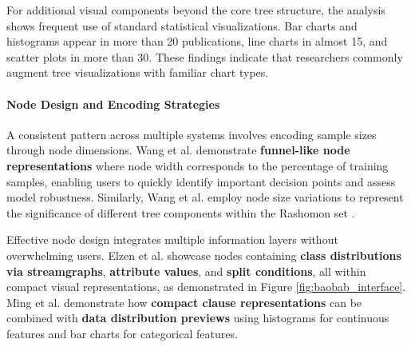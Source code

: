 For additional visual components beyond the core tree structure, the analysis shows frequent use of standard statistical visualizations. Bar charts and histograms appear in more than 20 publications, line charts in almost 15, and scatter plots in more than 30. These findings indicate that researchers commonly augment tree visualizations with familiar chart types.


\paragraph{Node Design and Encoding Strategies}

A consistent pattern across multiple systems involves encoding sample sizes through node dimensions. Wang et al. \cite{wang2022timbertrek} demonstrate \textbf{funnel-like node representations} where node width corresponds to the percentage of training samples, enabling users to quickly identify important decision points and assess model robustness. Similarly, Wang et al. \cite{wang2022timbertrek} employ node size variations to represent the significance of different tree components within the Rashomon set \cite{Streeb2021TaskBasedVI}.

Effective node design integrates multiple information layers without overwhelming users. Elzen et al. \cite{elzen2011baobabview} showcase nodes containing \textbf{class distributions via streamgraphs}, \textbf{attribute values}, and \textbf{split conditions}, all within compact visual representations, as demonstrated in Figure \ref{fig:baobab_interface}. Ming et al. \cite{ming2019rulematrix} demonstrate how \textbf{compact clause representations} can be combined with \textbf{data distribution previews} using histograms for continuous features and bar charts for categorical features.


